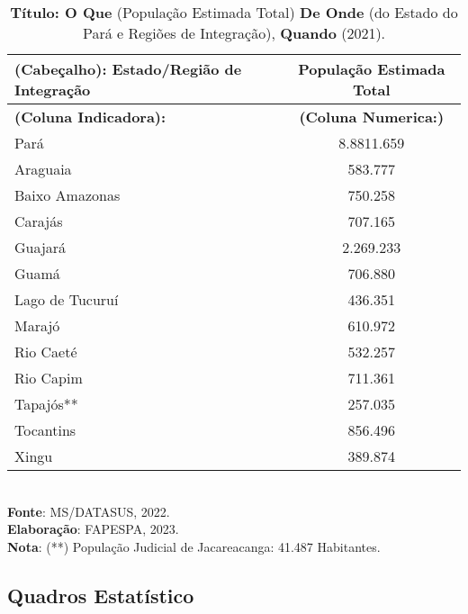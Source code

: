 \begin{table}[!htb]
    \centering
    {
    \caption{\textbf{Título: O Que} (População Estimada Total) \textbf{De Onde} (do Estado do Pará e Regiões de Integração), \textbf{Quando} (2021).}
    \label{amostras estratificada}
    \vspace{0.1cm}
\begin{tabular}{l|c}
  \hline\hline
  \textbf{(Cabeçalho)}: Estado/Região de Integração   & População Estimada Total \\
  \hline\hline
\textbf{(Coluna Indicadora):}     & \textbf{(Coluna Numerica:)}   \\
\hline
       Pará                       &  8.8811.659   \\
   Araguaia                       &   583.777    \\
   Baixo Amazonas                 &   750.258    \\
   Carajás                        &   707.165    \\
   Guajará                        & 2.269.233    \\ 
   Guamá                          & 706.880      \\
   Lago de Tucuruí                & 436.351      \\
   Marajó                         & 610.972      \\
   Rio Caeté                      & 532.257      \\
   Rio Capim                      & 711.361      \\
   Tapajós**                      & 257.035      \\
   Tocantins                      & 856.496      \\
   Xingu                          & 389.874      \\
   \hline\hline
\end{tabular}}
\\
\hspace{-7cm}
\textbf{Fonte}: MS/DATASUS, 2022. \\
\hspace{-6.9cm}
\textbf{Elaboração}: FAPESPA, 2023. \\
\hspace{-1.3cm}
\textbf{Nota}: (**) População Judicial de Jacareacanga: 41.487 Habitantes.
\end{table}








\newpage
\subsection{Quadros Estatístico}

